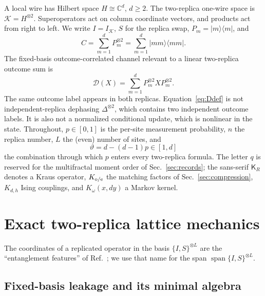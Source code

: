 \documentclass[aps,prx,reprint,superscriptaddress,nobibnotes,longbibliography]{revtex4-2}
\theoremstyle{remark}
\newcommand{\cK}{\mathcal K}
\newcommand{\vth}{\vartheta}
\begin{document}
A local wire has Hilbert space $H\cong\mathbb C^d$, $d\ge2$.  The two-replica one-wire space is $\cK=H^{\otimes2}$.  Superoperators act on column coordinate vectors, and products act from right to left.  We write $I=I_{\cK}$, $S$ for the replica swap, $P_m=|m\rangle\langle m|$, and
\begin{equation}
 C=\sum_{m=1}^d P_m^{\otimes2}=\sum_{m=1}^d|mm\rangle\langle mm|.
 \label{eq:Cdef}
\end{equation}
The fixed-basis outcome-correlated channel relevant to a linear two-replica outcome sum is
\begin{equation}
 \mathcal D(X)=\sum_{m=1}^dP_m^{\otimes2}X P_m^{\otimes2}.
 \label{eq:Ddef}
\end{equation}
The same outcome label appears in both replicas.  Equation~\eqref{eq:Ddef} is not independent-replica dephasing $\Delta^{\otimes2}$, which contains two independent outcome labels.  It is also not a normalized conditional update, which is nonlinear in the state.  Throughout, $p\in[0,1]$ is the per-site measurement probability, $n$ the replica number, $L$ the (even) number of sites, and
\begin{equation}
 \vth=d-(d-1)p\in[1,d]
 \label{eq:vth}
\end{equation}
the combination through which $p$ enters every two-replica formula.  The letter $q$ is reserved for the multifractal moment order of Sec.~\ref{sec:records}; the sans-serif $\mathsf K_R$ denotes a Kraus operator, $K_{\rm o/e}$ the matching factors of Sec.~\ref{sec:compression}, $K_{d,h}$ Ising couplings, and $K_\omega(x,dy)$ a Markov kernel.

\section{Exact two-replica lattice mechanics}

The coordinates of a replicated operator in the basis $\{I,S\}^{\otimes L}$ are the ``entanglement features'' of Ref.~\cite{Kuo2020}; we use that name for the span $\operatorname{span}\{I,S\}^{\otimes L}$.

\subsection{Fixed-basis leakage and its minimal algebra}
\end{document}
